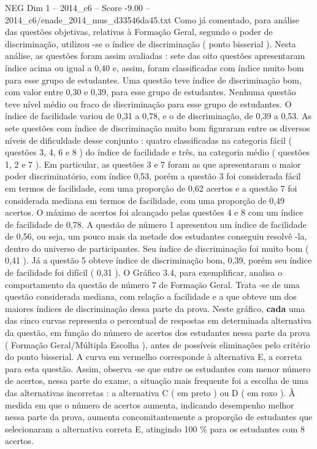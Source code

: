 \begin{textsample}{NEG Dim 1 – 2014\_c6 – Score -9.00 – 2014\_c6/enade\_2014\_mus\_d33546da45.txt}
Como já comentado, para análise das questões objetivas, relativas à Formação Geral, segundo o poder de discriminação, utilizou -se o índice de discriminação ( ponto bisserial ).
Nesta análise, as questões foram assim avaliadas : sete das oito questões apresentaram índice acima ou igual a 0,40 e, assim, foram classificadas com índice muito bom para esse grupo de estudantes.
Uma questão teve índice de discriminação bom, com valor entre 0,30 e 0,39, para esse grupo de estudantes.
Nenhuma questão teve nível médio ou fraco de discriminação para esse grupo de estudantes.
O índice de facilidade variou de 0,31 a 0,78, e o de discriminação, de 0,39 a 0,53.
As sete questões com índice de discriminação muito bom figuraram entre os diversos níveis de dificuldade desse conjunto : quatro classificadas na categoria fácil ( questões 3, 4, 6 e 8 ) do índice de facilidade e três, na categoria médio ( questões 1, 2 e 7 ).
Em particular, as questões 3 e 7 foram as que apresentaram o maior poder discriminatório, com índice 0,53, porém a questão 3 foi considerada fácil em termos de facilidade, com uma proporção de 0,62 acertos e a questão 7 foi considerada mediana em termos de facilidade, com uma proporção de 0,49 acertos.
O máximo de acertos foi alcançado pelas questões 4 e 8 com um índice de facilidade de 0,78.
A questão de número 1 apresentou um índice de facilidade de 0,56, ou seja, um pouco mais da metade dos estudantes conseguiu resolvê -la, dentro do universo de participantes.
Seu índice de discriminação foi muito bom ( 0,41 ).
Já a questão 5 obteve índice de discriminação bom, 0,39, porém seu índice de facilidade foi difícil ( 0,31 ).
O Gráfico 3.4, para exemplificar, analisa o comportamento da questão de número 7 de Formação Geral.
Trata -se de uma questão considerada mediana, com relação a facilidade e a que obteve um dos maiores índices de discriminação dessa parte da prova.
Neste gráfico, \textbf{cada} uma das cinco curvas representa o percentual de respostas em determinada alternativa da questão, em função do número de acertos dos estudantes nessa parte da prova ( Formação Geral/Múltipla Escolha ), antes de possíveis eliminações pelo critério do ponto bisserial.
A curva em vermelho corresponde à alternativa E, a correta para esta questão.
Assim, observa -se que entre os estudantes com menor número de acertos, nessa parte do exame, a situação mais frequente foi a escolha de uma das alternativas incorretas : a alternativa C ( em preto ) ou D ( em roxo ).
À medida em que o número de acertos aumenta, indicando desempenho melhor nessa parte da prova, aumenta concomitantemente a proporção de estudantes que selecionaram a alternativa correta E, atingindo 100 \% para os estudantes com 8 acertos.

\end{textsample}
